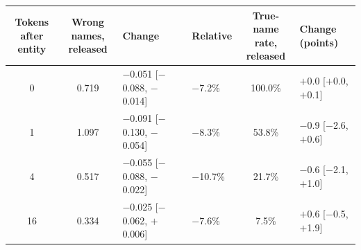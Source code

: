 \begin{tabular}{@{}ccllcl@{}}
\toprule
\shortstack[l]{Tokens after\\entity} & \shortstack[l]{Wrong names,\\released} & Change & Relative & \shortstack[l]{True-name\\rate, released} & \shortstack[l]{Change\\(points)} \\
\midrule
0 & 0.719 & $-$0.051 {\scriptsize[$-$0.088, $-$0.014]} & $-$7.2\% & 100.0\% & $+$0.0 {\scriptsize[$+$0.0, $+$0.1]} \\
1 & 1.097 & $-$0.091 {\scriptsize[$-$0.130, $-$0.054]} & $-$8.3\% & 53.8\% & $-$0.9 {\scriptsize[$-$2.6, $+$0.6]} \\
4 & 0.517 & $-$0.055 {\scriptsize[$-$0.088, $-$0.022]} & $-$10.7\% & 21.7\% & $-$0.6 {\scriptsize[$-$2.1, $+$1.0]} \\
16 & 0.334 & $-$0.025 {\scriptsize[$-$0.062, $+$0.006]} & $-$7.6\% & 7.5\% & $+$0.6 {\scriptsize[$-$0.5, $+$1.9]} \\
\bottomrule
\end{tabular}
